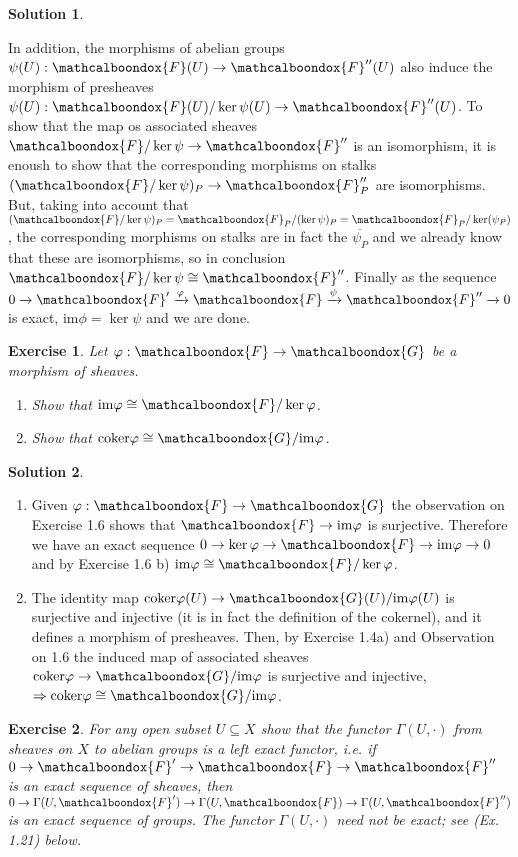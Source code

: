 \documentclass[12pt]{article}
\newcommand{\imp}{\ensuremath{\Rightarrow}}
\newcommand{\ima}{\ensuremath{\mathrm{im}}}
\newtheorem{ex}{Exercise}[section]
\theoremstyle{definition}
\newtheorem*{sol}{Solution}
\newcommand{\sF}{\ensuremath{\mathcalboondox{F}}}
\newcommand{\sG}{\ensuremath{\mathcalboondox{G}}}
\begin{document}
\begin{sol}
\begin{enumerate}[label=\alph*)]
		In addition, the morphisms of abelian groups $\psi(U): \sF(U) \to \sF''(U)$ also induce the morphism of presheaves $\psi(U): \sF(U)/\ker \psi(U) \to \sF''(U)$. To show that the map os associated sheaves $\sF/\ker \psi \to \sF''$ is an isomorphism, it is enoush to show that the corresponding morphisms on stalks $(\sF/\ker \psi)_P \to \sF''_P$ are isomorphisms. But, taking into account that $(\sF/\ker \psi)_P = \sF_P / (\ker \psi)_P = \sF_P / \ker(\psi_P)$, the corresponding morphisms on stalks are in fact the $\overline{\psi_P}$ and we already know that these are isomorphisms, so in conclusion $\sF/\ker \psi \cong \sF''$. Finally as the sequence $0 \xrightarrow[]{} \sF' \xrightarrow[]{\varphi} \sF \xrightarrow[]{\psi} \sF'' \xrightarrow[]{} 0$ is exact, $\ima \phi = \ker \psi$ and we are done.
	\end{enumerate}
\end{sol}

\begin{ex}
	Let $\varphi: \sF \to \sG$ be a morphism of sheaves.
	\begin{enumerate}[label=\alph*)]
		\item Show that $\ima \varphi \cong \sF/\ker \varphi$.
		\item Show that $\text{coker} \varphi \cong \sG /\ima \varphi$.
	\end{enumerate}
\end{ex}

\begin{sol}
	\begin{enumerate}[label=\alph*)]
		\item Given $\varphi: \sF \to \sG$ the observation on Exercise 1.6 shows that $\sF \to \ima \varphi$ is surjective. Therefore we have an exact sequence $0 \to \ker \varphi \to \sF \to \ima \varphi \to 0$ and by Exercise 1.6 b) $\ima \varphi \cong \sF / \ker \varphi$.

		\item The identity map $\text{coker} \varphi (U) \to \sG(U)/ \ima \varphi(U)$ is surjective and injective (it is in fact the definition of the cokernel), and it defines a morphism of presheaves. Then, by Exercise 1.4a) and Observation on 1.6 the induced map of associated sheaves $\text{coker} \varphi \to \sG/ \ima \varphi$ is surjective and injective, $\imp \text{coker} \varphi \cong \sG/ \ima \varphi$.
	\end{enumerate}
\end{sol}

\begin{ex}
	For any open subset $U \subseteq X$ show that the functor $\Gamma(U,·)$ from sheaves on $X$ to abelian groups is a left exact functor, i.e. if $0 \to \sF' \to \sF \to \sF''$ is an exact sequence of sheaves, then $0 \to \Gamma(U,\sF') \to \Gamma(U, \sF) \to \Gamma(U, \sF'')$ is an exact sequence of groups. The functor $\Gamma(U,·)$ need not be exact; see (Ex. 1.21) below.
\end{ex}
\end{document}
